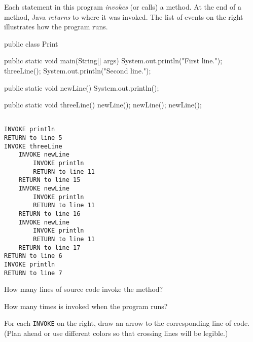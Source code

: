 
Each statement in this program \emph{invokes} (or calls) a method.
At the end of a method, Java \emph{returns} to where it was invoked.
The list of events on the right illustrates how the program runs.

\vspace{3ex}

\begin{minipage}{0.68\textwidth}
\begin{javabox}
public class Print {
    
    public static void main(String[] args) {
        System.out.println("First line.");
        threeLine();
        System.out.println("Second line.");
    }
    
    public static void newLine() {
        System.out.println();
    }
    
    public static void threeLine() {
        newLine();
        newLine();
        newLine();
    }
    
}
\end{javabox}
\end{minipage}
\hfill
\begin{minipage}{0.34\textwidth}
\begin{verbatim}

INVOKE println
RETURN to line 5
INVOKE threeLine
    INVOKE newLine
        INVOKE println
        RETURN to line 11
    RETURN to line 15
    INVOKE newLine
        INVOKE println
        RETURN to line 11
    RETURN to line 16
    INVOKE newLine
        INVOKE println
        RETURN to line 11
    RETURN to line 17
RETURN to line 6
INVOKE println
RETURN to line 7

\end{verbatim}
\end{minipage}




\Q \label{lines}
How many lines of source code invoke the  method? 
\vspace{1em}


\Q \label{times}
How many times is  invoked when the program runs? 
\vspace{1em}


\Q For each \texttt{INVOKE} on the right, draw an arrow to the corresponding line of code.
(Plan ahead or use different colors so that crossing lines will be legible.)
\vspace{1em}


